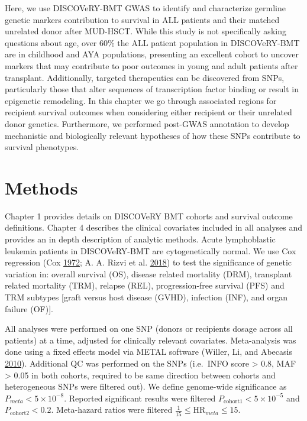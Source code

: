 \documentclass[]{DissertateOSU}
\begin{document}
Here, we use DISCOVeRY-BMT GWAS to identify and characterize germline
genetic markers contribution to survival in ALL patients and their
matched unrelated donor after MUD-HSCT. While this study is not
specifically asking questions about age, over 60\% the ALL patient
population in DISCOVeRY-BMT are in childhood and AYA populations,
presenting an excellent cohort to uncover markers that may contribute to
poor outcomes in young and adult patients after transplant.
Additionally, targeted therapeutics can be discovered from SNPs,
particularly those that alter sequences of transcription factor binding
or result in epigenetic remodeling. In this chapter we go through
associated regions for recipient survival outcomes when considering
either recipient or their unrelated donor genetics. Furthermore, we
performed post-GWAS annotation to develop mechanistic and biologically
relevant hypotheses of how these SNPs contribute to survival phenotypes.

\section{Methods}\label{methods-2}

Chapter 1 provides details on DISCOVeRY BMT cohorts and survival outcome
definitions. Chapter 4 describes the clinical covariates included in all
analyses and provides an in depth description of analytic methods. Acute
lymphoblastic leukemia patients in DISCOVeRY-BMT are cytogenetically
normal. We use Cox regression (Cox
\protect\hyperlink{ref-cox1972}{1972}; A. A. Rizvi et al.
\protect\hyperlink{ref-Rizvi_2018}{2018}) to test the significance of
genetic variation in: overall survival (OS), disease related mortality
(DRM), transplant related mortality (TRM), relapse (REL),
progression-free survival (PFS) and TRM subtypes {[}graft versus host
disease (GVHD), infection (INF), and organ failure (OF){]}.

All analyses were performed on one SNP (donors or recipients dosage
across all patients) at a time, adjusted for clinically relevant
covariates. Meta-analysis was done using a fixed effects model via METAL
software (Willer, Li, and Abecasis \protect\hyperlink{ref-metal}{2010}).
Additional QC was performed on the SNPs (i.e.~INFO score \textgreater{}
0.8, MAF \textgreater{} 0.05 in both cohorts, required to be same
direction between cohorts and heterogeneous SNPs were filtered out). We
define genome-wide significance as \(P_{meta} < 5 \times{10}^{-8}\).
Reported significant results were filtered
\(P_{\text{cohort1}} < 5\times{10}^{-5}\) and
\(P_{\text{cohort2}} < 0.2\). Meta-hazard ratios were filtered
\(\frac{1}{15} \leq \text{HR}_{meta} \leq 15\).
\end{document}
